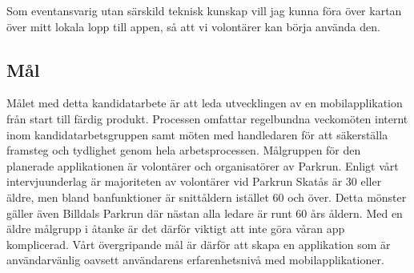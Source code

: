 \vspace{1em}
Som eventansvarig utan särskild teknisk kunskap vill jag kunna föra över kartan över mitt lokala lopp till appen, så att vi volontärer kan börja använda den. 


\subsection{Mål}
Målet med detta kandidatarbete är att leda utvecklingen av en mobilapplikation från start till färdig produkt. Processen omfattar regelbundna veckomöten internt inom kandidatarbetsgruppen samt möten med handledaren för att säkerställa framsteg och tydlighet genom hela arbetsprocessen. Målgruppen för den planerade applikationen är volontärer och organisatörer av Parkrun. Enligt vårt intervjuunderlag är majoriteten av volontärer vid Parkrun Skatås är 30 eller äldre, men bland banfunktioner är snittåldern istället 60 och över. Detta mönster gäller även Billdals Parkrun där nästan alla ledare är runt 60 års åldern. Med en äldre målgrupp i åtanke är det därför viktigt att inte göra våran app komplicerad. Vårt övergripande mål är därför att skapa en applikation som är användarvänlig oavsett användarens erfarenhetsnivå med mobilapplikationer.


